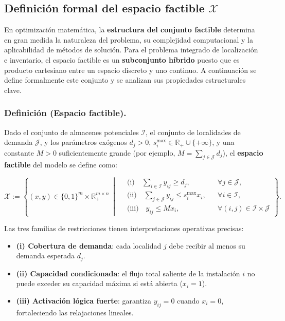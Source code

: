 \documentclass[
  spanish,
  us-letterpaper,
]{scrreprt}
\providecommand{\tightlist}{%
  \setlength{\itemsep}{0pt}\setlength{\parskip}{0pt}}
\numberwithin{equation}{section}
\begin{document}
\subsection{\texorpdfstring{\textbf{Definición formal del espacio
factible
\(\mathcal{X}\)}}{Definición formal del espacio factible \textbackslash mathcal\{X\}}}\label{definiciuxf3n-formal-del-espacio-factible-mathcalx}

En optimización matemática, la \textbf{estructura del conjunto factible}
determina en gran medida la naturaleza del problema, su complejidad
computacional y la aplicabilidad de métodos de solución. Para el
problema integrado de localización e inventario, el espacio factible es
un \textbf{subconjunto híbrido} puesto que es producto cartesiano entre
un espacio discreto y uno continuo. A continuación se define formalmente
este conjunto y se analizan sus propiedades estructurales clave.

\subsubsection{\texorpdfstring{\textbf{Definición (Espacio
factible).}}{Definición (Espacio factible).}}\label{definiciuxf3n-espacio-factible.}

Dado el conjunto de almacenes potenciales \(\mathcal{I}\), el conjunto
de localidades de demanda \(\mathcal{J}\), y los parámetros exógenos
\(d_j > 0\), \(s_i^{\max} \in \mathbb{R}_+ \cup \{+\infty\}\), y una
constante \(M > 0\) suficientemente grande (por ejemplo,
\(M = \sum_{j \in \mathcal{J}} d_j\)), el \textbf{espacio factible} del
modelo se define como:

\[
\mathcal{X} := 
\left\{
(x, y) \in \{0,1\}^m \times \mathbb{R}_+^{m \times n}
\ \middle|\
\begin{aligned}
&\text{(i)}\quad \sum_{i \in \mathcal{I}} y_{ij} \ge d_j, && \forall j \in \mathcal{J}, \\
&\text{(ii)}\quad \sum_{j \in \mathcal{J}} y_{ij} \le s_i^{\max} x_i, && \forall i \in \mathcal{I}, \\
&\text{(iii)}\quad y_{ij} \le M x_i, && \forall (i,j) \in \mathcal{I}\times\mathcal{J}
\end{aligned}
\right\}.
\]

Las tres familias de restricciones tienen interpretaciones operativas
precisas:

\begin{itemize}
\tightlist
\item
  \textbf{(i) Cobertura de demanda}: cada localidad \(j\) debe recibir
  al menos su demanda esperada \(d_j\).
\item
  \textbf{(ii) Capacidad condicionada}: el flujo total saliente de la
  instalación \(i\) no puede exceder su capacidad máxima si está abierta
  (\(x_i = 1\)).\\
\item
  \textbf{(iii) Activación lógica fuerte}: garantiza \(y_{ij}=0\) cuando
  \(x_i=0\), fortaleciendo las relajaciones lineales.
\end{itemize}
\end{document}
